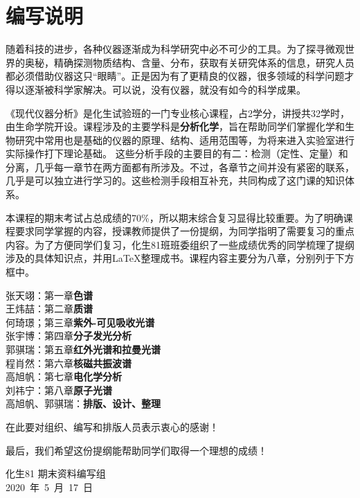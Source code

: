 \chapter*{编写说明}

随着科技的进步，各种仪器逐渐成为科学研究中必不可少的工具。为了探寻微观世界的奥秘，精确探测物质结构、含量、分布，获取有关研究体系的信息，研究人员都必须借助仪器这只“眼睛”。正是因为有了更精良的仪器，很多领域的科学问题才得以逐渐被科学家解决。可以说，没有仪器，就没有如今的科学成果。

《现代仪器分析》是化生试验班的一门专业核心课程，占2学分，讲授共32学时，由生命学院开设。课程涉及的主要学科是\textbf{分析化学}，旨在帮助同学们掌握化学和生物研究中常用也是基础的仪器的原理、结构、适用范围等，为将来进入实验室进行实际操作打下理论基础。
这些分析手段的主要目的有二：检测（定性、定量）和分离，几乎每一章节在两方面都有所涉及。不过，各章节之间并没有紧密的联系，几乎是可以独立进行学习的。这些检测手段相互补充，共同构成了这门课的知识体系。

本课程的期末考试占总成绩的70\%，所以期末综合复习显得比较重要。为了明确课程要求同学掌握的内容，授课教师提供了一份提纲，为同学指明了需要复习的重点内容。为了方便同学们复习，化生81班班委组织了一些成绩优秀的同学梳理了提纲涉及的具体知识点，并用\LaTeX 整理成书。课程内容主要分为八章，分别列于下方框中。
\begin{tcolorbox}[title={\bfseries 编写组成员}]
	 张天翊：第一章\hspace{1em}\textbf{色谱}\\
	 王炜喆：第二章\hspace{1em}\textbf{质谱}\\
	 何琦璟；第三章\hspace{1em}\textbf{紫外-可见吸收光谱}\\
	 张宇博：第四章\hspace{1em}\textbf{分子发光分析}\\
	 郭骐瑞：第五章\hspace{1em}\textbf{红外光谱和拉曼光谱}\\
	 程肖然：第六章\hspace{1em}\textbf{核磁共振波谱}\\
	 高旭帆：第七章\hspace{1em}\textbf{电化学分析}\\
	 刘祎宁：第八章\hspace{1em}\textbf{原子光谱}\\
	 高旭帆、郭骐瑞：\textbf{排版、设计、整理}
\end{tcolorbox}
在此要对组织、编写和排版人员表示衷心的感谢！

最后，我们希望这份提纲能帮助同学们取得一个理想的成绩！

\vskip 1.5cm

\begin{flushright}
	化生81 期末资料编写组\\
	2020\ 年\ 5\ 月\ 17\ 日
\end{flushright}